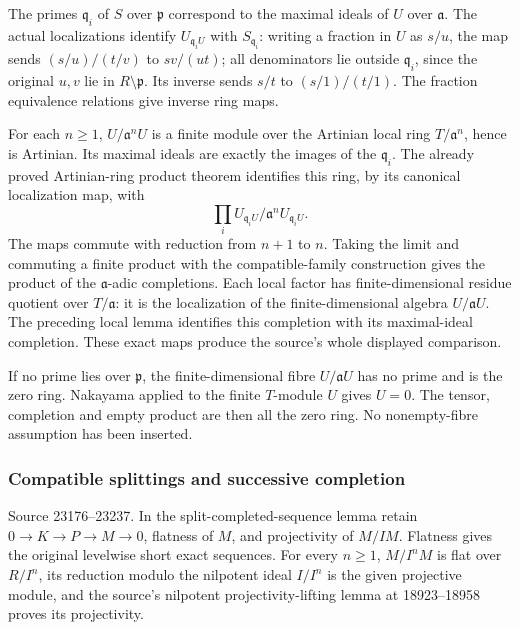 The primes \(\mathfrak q_i\) of \(S\) over \(\mathfrak p\) correspond to the maximal ideals of \(U\) over \(\mathfrak a\). The actual localizations identify \(U_{\mathfrak q_iU}\) with \(S_{\mathfrak q_i}\): writing a fraction in \(U\) as \(s/u\), the map sends \((s/u)/(t/v)\) to \(sv/(ut)\); all denominators lie outside \(\mathfrak q_i\), since the original \(u,v\) lie in \(R\setminus\mathfrak p\). Its inverse sends \(s/t\) to \((s/1)/(t/1)\). The fraction equivalence relations give inverse ring maps.

For each \(n\geq1\), \(U/\mathfrak a^nU\) is a finite module over the Artinian local ring \(T/\mathfrak a^n\), hence is Artinian. Its maximal ideals are exactly the images of the \(\mathfrak q_i\). The already proved Artinian-ring product theorem identifies this ring, by its canonical localization map, with \[
\prod_i U_{\mathfrak q_iU}/\mathfrak a^nU_{\mathfrak q_iU}.
\] The maps commute with reduction from \(n+1\) to \(n\). Taking the limit and commuting a finite product with the compatible-family construction gives the product of the \(\mathfrak a\)-adic completions. Each local factor has finite-dimensional residue quotient over \(T/\mathfrak a\): it is the localization of the finite-dimensional algebra \(U/\mathfrak aU\). The preceding local lemma identifies this completion with its maximal-ideal completion. These exact maps produce the source's whole displayed comparison.

If no prime lies over \(\mathfrak p\), the finite-dimensional fibre \(U/\mathfrak aU\) has no prime and is the zero ring. Nakayama applied to the finite \(T\)-module \(U\) gives \(U=0\). The tensor, completion and empty product are then all the zero ring. No nonempty-fibre assumption has been inserted.

\subsubsection{Compatible splittings and successive completion}\label{compatible-splittings-and-successive-completion}

Source 23176--23237. In the split-completed-sequence lemma retain \(0\to K\to P\to M\to0\), flatness of \(M\), and projectivity of \(M/IM\). Flatness gives the original levelwise short exact sequences. For every \(n\geq1\), \(M/I^nM\) is flat over \(R/I^n\), its reduction modulo the nilpotent ideal \(I/I^n\) is the given projective module, and the source's nilpotent projectivity-lifting lemma at 18923--18958 proves its projectivity.

